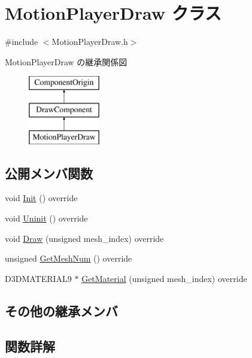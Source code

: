 \hypertarget{class_motion_player_draw}{}\section{Motion\+Player\+Draw クラス}
\label{class_motion_player_draw}


{\ttfamily \#include $<$Motion\+Player\+Draw.\+h$>$}

Motion\+Player\+Draw の継承関係図\begin{figure}[H]
\begin{center}
\leavevmode
\includegraphics[height=3.000000cm]{class_motion_player_draw}
\end{center}
\end{figure}
\subsection*{公開メンバ関数}
\begin{DoxyCompactItemize}
\item 
void \mbox{\hyperlink{class_motion_player_draw_a239ef4dbc11dffb9a209d8e07e0847d0}{Init}} () override
\item 
void \mbox{\hyperlink{class_motion_player_draw_a392cb581981fc81976b1328d17f95b4f}{Uninit}} () override
\item 
void \mbox{\hyperlink{class_motion_player_draw_ae6fce4edb17d1c914c2bcfa01d21d606}{Draw}} (unsigned mesh\+\_\+index) override
\item 
unsigned \mbox{\hyperlink{class_motion_player_draw_ae671eb029c18c7927fa6671b6a8fb637}{Get\+Mesh\+Num}} () override
\item 
D3\+D\+M\+A\+T\+E\+R\+I\+A\+L9 $\ast$ \mbox{\hyperlink{class_motion_player_draw_a5881c5114b069f5e8ceb91a5cb388205}{Get\+Material}} (unsigned mesh\+\_\+index) override
\end{DoxyCompactItemize}
\subsection*{その他の継承メンバ}


\subsection{関数詳解}
\mbox{\label{class_motion_player_draw_ae6fce4edb17d1c914c2bcfa01d21d606}} 
